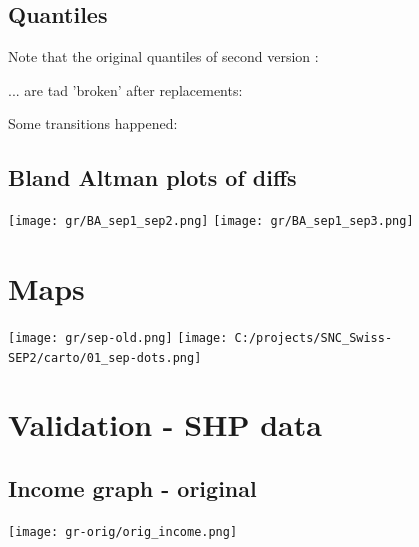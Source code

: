 \documentclass[a4paper, notitlepage, fleqn]{article} %
\begin{document}
\subsection{Quantiles}

Note that the original quantiles of second version :
\begin{stlog}\end{stlog}
... are tad 'broken' after replacements:
\begin{stlog}\end{stlog}
\begin{landscape}
Some transitions happened:  
\begin{stlog}\end{stlog}
\end{landscape}

\subsection{Bland Altman plots of diffs}

\begin{center}
\texttt{[image: gr/BA\_sep1\_sep2.png]} 
\texttt{[image: gr/BA\_sep1\_sep3.png]} 
\end{center}
\newpage
\section{Maps}
\begin{center}
\texttt{[image: gr/sep-old.png]} 
\texttt{[image: C:/projects/SNC\_Swiss-SEP2/carto/01\_sep-dots.png]} 
\end{center}
\newpage
\section{Validation - SHP data}

\subsection{Income graph - original}

\begin{center}
\texttt{[image: gr-orig/orig\_income.png]} 
\end{center}
\end{document}
